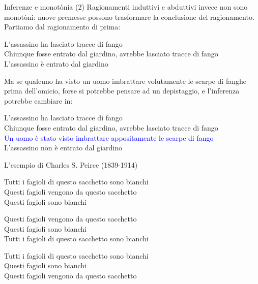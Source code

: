 \documentclass[aspectratio=169,10pt,dvipsnames,handout]{beamer}
\begin{document}
\begin{frame}{Inferenze e monotònia (2)}
	Ragionamenti induttivi e abduttivi invece \alert{non sono monotòni}: nuove premesse possono trasformare la conclusione del ragionamento. Partiamo dal ragionamento di prima:
	\begin{center}
		\begin{inference}
			L'assassino ha lasciato tracce di fango\\
			Chiunque fosse entrato dal giardino, avrebbe lasciato tracce di fango\\
			\hline
			L'assassino è entrato dal giardino
		\end{inference}
	\end{center}

	\pause
	Ma se qualcuno ha visto un uomo imbrattare volutamente le scarpe di fanghe prima dell'omicio, forse si potrebbe pensare ad un \alert{depistaggio}, e l'inferenza potrebbe cambiare in:
	\begin{center}
		\begin{inference}
			L'assassino ha lasciato tracce di fango\\
			Chiunque fosse entrato dal giardino, avrebbe lasciato tracce di fango\\
			\textcolor{blue}{Un uomo è stato visto imbrattare appositamente le scarpe di fango}\\
			\hline
			L'assassino non è entrato dal giardino
		\end{inference}
	\end{center}
\end{frame}


\begin{frame}{L'esempio di Charles S. Peirce (1839-1914)}
	\begin{inference}
		Tutti i fagioli di questo sacchetto sono bianchi\\
		Questi fagioli vengono da questo sacchetto\\
		\hline
		Questi fagioli sono bianchi
	\end{inference}
	\only<2->{\qquad \textbf{Deduzione}}

	\medskip\medskip
	\begin{inference}
		Questi fagioli vengono da questo sacchetto\\
		Questi fagioli sono bianchi\\
		\hline
		Tutti i fagioli di questo sacchetto sono bianchi\\
	\end{inference}
	\only<3->{\qquad \textbf{Induzione}}

	\medskip\medskip
	\begin{inference}
		Tutti i fagioli di questo sacchetto sono bianchi\\
		Questi fagioli sono bianchi\\
		\hline
		Questi fagioli vengono da questo sacchetto
	\end{inference}
\end{frame}
\end{document}
